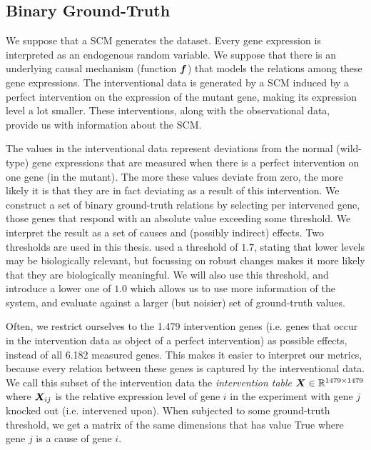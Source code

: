 \subsection{Binary Ground-Truth}
We suppose that a SCM generates the dataset. Every gene expression is interpreted as an endogenous random variable. We suppose that there is an underlying causal mechanism (function $\bm{f}$) that models the relations among these gene expressions. The interventional data is generated by a SCM induced by a perfect intervention on the expression of the mutant gene, making its expression level a lot smaller. These interventions, along with the observational data, provide us with information about the SCM. 

The values in the interventional data represent deviations from the normal (wild-type) gene expressions that are measured when there is a perfect intervention on one gene (in the mutant). The more these values deviate from zero, the more likely it is that they are in fact deviating as a result of this intervention. We construct a set of binary ground-truth relations by selecting per intervened gene, those genes that respond with an absolute value exceeding some threshold. We interpret the result as a set of causes and (possibly indirect) effects. Two thresholds are used in this thesis. \citet{kemmeren2014large} used a threshold of $1.7$, stating that lower levels may be biologically relevant, but focussing on robust changes makes it more likely that they are biologically meaningful. We will also use this threshold, and introduce a lower one of $1.0$ which allows us to use more information of the system, and evaluate against a larger (but noisier) set of ground-truth values. 

Often, we restrict ourselves to the 1.479 intervention genes (i.e. genes that occur in the intervention data as object of a perfect intervention) as possible effects, instead of all 6.182 measured genes. This makes it easier to interpret our metrics, because every relation between these genes is captured by the interventional data. We call this subset of the intervention data the \textit{intervention table} $\bm{X} \in \mathbb{R}^{1479\times 1479}$ where $\bm{X}_{ij}$ is the relative expression level of gene $i$ in the experiment with gene $j$ knocked out (i.e. intervened upon). When subjected to some ground-truth threshold, we get a matrix of the same dimensions that has value True where gene $j$ is a cause of gene $i$.

